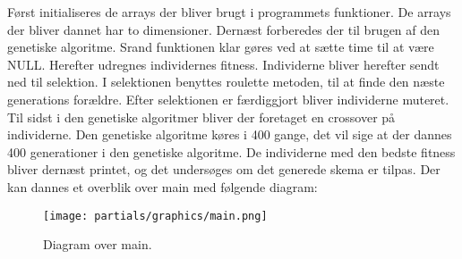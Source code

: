 Først initialiseres de arrays der bliver brugt i programmets funktioner. De arrays der bliver dannet har to dimensioner.
Dernæst forberedes der til brugen af den genetiske algoritme. Srand funktionen klar gøres ved at sætte time til at være NULL. Herefter udregnes individernes fitness. Individerne bliver herefter sendt ned til selektion. I selektionen benyttes roulette metoden, til at finde den næste generations forældre. Efter selektionen er færdiggjort bliver individerne muteret. Til sidst i den genetiske algoritmer bliver der foretaget en crossover på individerne. Den genetiske algoritme køres i 400 gange, det vil sige at der dannes 400 generationer i den genetiske algoritme.  De individerne med den bedste fitness bliver dernæst printet, og det undersøges om det generede skema er tilpas. Der kan dannes et overblik over main med følgende diagram:
\begin{figure}[!h]
  \centering
  \texttt{[image: partials/graphics/main.png]}
  \caption{Diagram over main\footfullcite.}
  \label{fig:main}
\end{figure}
